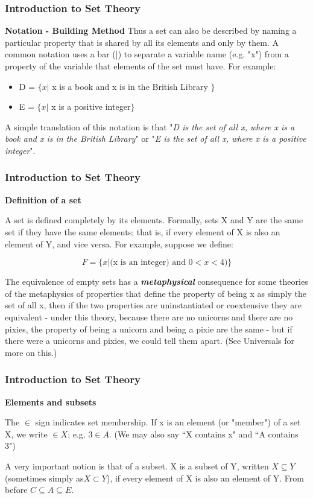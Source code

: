 \documentclass[12pt]{article}
\begin{document}
\begin{frame}
	\frametitle{Introduction to Set Theory}
	\large
\textbf{Notation - Building Method}
Thus a set can also be described by naming a particular property that is shared by all its elements and only by them. A common notation uses a bar (|) to separate a variable name (e.g. "x") from a property of the variable that elements of the set must have. For example:
\begin{itemize}
\item D = $\{x |$ x is a book and x is in the British Library $\}$
\item E = $\{x |$ x is a positive integer$\}$
\end{itemize}
A simple translation of this notation is that "\textit{D is the set of all x, where x is a book and x is in the British Library}" or "\textit{E is the set of all x, where x is a positive integer}".

\end{frame}
\begin{frame}
	\frametitle{Introduction to Set Theory}
	\large
\textbf{Definition of a set}

A set is defined completely by its elements. Formally, sets X and Y are the same set if they have the same elements; that is, if every element of X is also an element of Y, and vice versa. For example, suppose we define:

\[ F = \{x | \mbox{(x is an integer)} \mbox{ and } 0 < x < 4)\}  \]

The equivalence of empty sets has a \textbf{\textit{metaphysical}} consequence for some theories of the metaphysics of properties that define the property of being x as simply the set of all x, then if the two properties are uninstantiated or coextensive they are equivalent - under this theory, because there are no unicorns and there are no pixies, the property of being a unicorn and being a pixie are the same - but if there were a unicorns and pixies, we could tell them apart. (See Universals for more on this.)
\end{frame}
\begin{frame}
	\frametitle{Introduction to Set Theory}
	\large
	
\textbf{Elements and subsets}

The $\in$  sign indicates set membership. If x is an element (or "member") of a set X, we write $ \in X$; e.g. $3\in A$. (We may also say ``X contains x" and ``A contains 3")

A very important notion is that of a subset. X is a subset of Y, written $X \subseteq Y$ (sometimes simply as$X \subset Y$), if every element of X is also an element of Y. From before $C\subseteq A \subseteq E$.
\end{frame}
\end{document}
